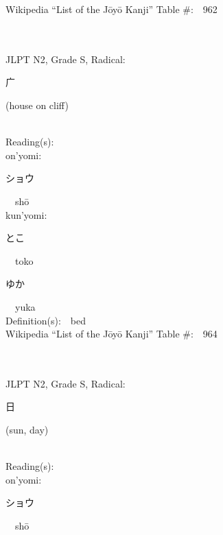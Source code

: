 \begin{multicols}{2}
Wikipedia ``List of the J\=oy\=o Kanji'' Table \#:\ \ 962 \\
\ \ \\
{\fontsize{34pt}{40pt}  }\ \ \\  %
{JLPT N2, Grade S, Radical:\ \ {\begin{CJK}{UTF8}{min} 广 \end{CJK}} (house on cliff) } \\
Reading(s):\ \ \\
{\hspace*{1em}}on'yomi:\ \ \\
{\hspace*{2em}}{\begin{CJK}{UTF8}{min} ショウ \end{CJK}}\ \ sh\=o\ \ \\
{\hspace*{1em}}kun'yomi:\ \ \\
{\hspace*{2em}}{\begin{CJK}{UTF8}{min} とこ \end{CJK}}\ \ toko\ \ \\
{\hspace*{2em}}{\begin{CJK}{UTF8}{min} ゆか \end{CJK}}\ \ yuka\ \ \\
Definition(s):\ \ bed \\
Wikipedia ``List of the J\=oy\=o Kanji'' Table \#:\ \ 964 \\
\ \ \\
{\fontsize{34pt}{40pt}  }\ \ \\  %
{JLPT N2, Grade S, Radical:\ \ {\begin{CJK}{UTF8}{min} 日 \end{CJK}} (sun, day) } \\
Reading(s):\ \ \\
{\hspace*{1em}}on'yomi:\ \ \\
{\hspace*{2em}}{\begin{CJK}{UTF8}{min} ショウ \end{CJK}}\ \ sh\=o\ \ \\

\end{multicols}
